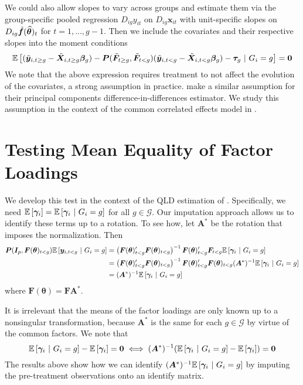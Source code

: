 \documentclass[12pt]{article}
\begin{document}
We could also allow slopes to vary across groups and estimate them via the group-specific pooled regression $D_{ig} y_{it}$ on $D_{ig} \bm x_{it}$ with unit-specific slopes on $D_{ig} \Tilde{\bm f}(\widehat{\bm \theta})_t$ for $t = 1,..., g-1$. Then we include the covariates and their respective slopes into the moment conditions
\begin{equation}
    \mathbb{E}\left[(\tilde{\bm y}_{i,t\geq g} - \tilde{\bm X}_{i, t \geq g} \bm \beta_g) - \bm P(\tilde{\bm F}_{t \geq g}, \tilde{\bm F}_{t < g}) (\tilde{\bm y}_{i,t< g} - \tilde{\bm X}_{i, t < g} \bm \beta_g) - \bm \tau_g   \ \vert \ G_i = g\right] = \bm 0
\end{equation}
We note that the above expression requires treatment to not affect the evolution of the covariates, a strong assumption in practice. \citet{Chan_and_Kwok_2022} make a similar assumption for their principal components difference-in-differences estimator. We study this assumption in the context of the common correlated effects model in \citet{Brown_Butts_Westerlund_2023}.


\section{Testing Mean Equality of Factor Loadings}

We develop this test in the context of the QLD estimation of \citet{Ahn_Lee_Schmidt_2013}. Specifically, we need $\mathbb{E}\left[\bm \gamma_i\right] = \mathbb{E}\left[\bm \gamma_i \ \vert \ G_i = g\right]$ for all $g \in \mathcal{G}$. Our imputation approach allows us to identify these terms up to a rotation. To see how, let $\bm A^*$ be the rotation that imposes the \citet{Ahn_Lee_Schmidt_2013} normalization. Then
\begin{align*}
    \bm P(\bm I_{p}, \bm F(\bm \theta)_{t < g}) \mathbb{E}\left[\bm y_{i, t < g} \ \vert \ G_i = g\right] 
    &= \left( \bm F(\bm \theta)_{t < g}' \bm F(\bm \theta)_{t < g} \right)^{-1} \bm F(\bm \theta)_{t < g}' \bm F_{t < g} \mathbb{E}\left[\bm \gamma_i \ \vert \ G_i = g\right]\\
    &= \left( \bm F(\bm \theta)_{t < g}' \bm F(\bm \theta)_{t < g} \right)^{-1} \bm F(\bm \theta)_{t < g}' \bm F(\bm \theta)_{t < g} (\bm A^*)^{-1} \mathbb{E}\left[\bm \gamma_i \ \vert \ G_i = g\right]\\
    &= (\bm A^*)^{-1} \mathbb{E}\left[\bm \gamma_i \ \vert \ G_i = g\right]
\end{align*}
where $\bm F(\bm \theta) = \bm F \bm A^*$.

It is irrelevant that the means of the factor loadings are only known up to a nonsingular transformation, because $\bm A^*$ is the same for each $g \in \mathcal{G}$ by virtue of the common factors. We note that
\begin{equation}
    \mathbb{E}\left[\bm \gamma_i \ \vert \ G_i = g\right] - \mathbb{E}\left[\bm \gamma_i\right] = \bm 0 \iff (\bm A^*)^{-1}(\mathbb{E}\left[\bm \gamma_i \ \vert \ G_i = g\right] - \mathbb{E}\left[\bm \gamma_i\right]) = \bm 0
\end{equation}
The results above show how we can identify $(\bm A^*)^{-1} \mathbb{E}\left[\bm \gamma_i \ \vert \ G_i = g\right]$ by imputing the pre-treatment observations onto an identify matrix. 
\end{document}
